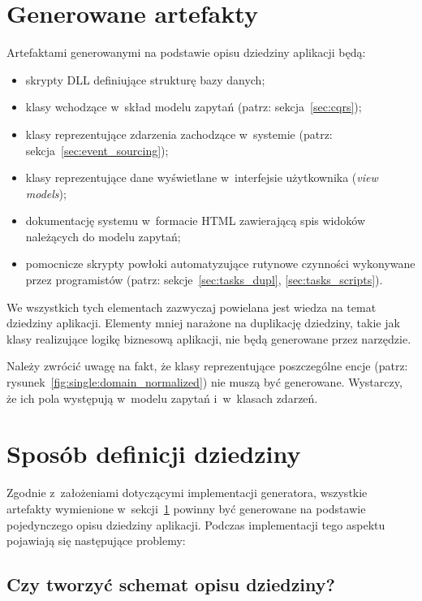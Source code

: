 \section{Generowane artefakty} \label{sec:generated_artifacts}

Artefaktami generowanymi na podstawie opisu dziedziny aplikacji będą:

\begin{itemize}
 \item skrypty DLL definiujące strukturę bazy danych;
 \item klasy wchodzące w~skład modelu zapytań (patrz: sekcja~\ref{sec:cqrs});
 \item klasy reprezentujące zdarzenia zachodzące w~systemie (patrz: sekcja~\ref{sec:event_sourcing});
 \item klasy reprezentujące dane wyświetlane w~interfejsie użytkownika (\emph{view models});
 \item dokumentację systemu w~formacie HTML zawierającą spis widoków należących do modelu zapytań;
 \item pomocnicze skrypty powłoki automatyzujące rutynowe czynności wykonywane przez programistów (patrz: sekcje~\ref{sec:tasks_dupl}, \ref{sec:tasks_scripts}).
\end{itemize}

We wszystkich tych elementach zazwyczaj powielana jest wiedza na temat dziedziny aplikacji.
Elementy mniej narażone na duplikację dziedziny, takie jak klasy realizujące logikę biznesową aplikacji, nie będą generowane przez narzędzie.

Należy zwrócić uwagę na fakt, że klasy reprezentujące poszczególne encje (patrz: rysunek~\ref{fig:single:domain_normalized}) nie muszą być generowane.
Wystarczy, że ich pola występują w~modelu zapytań i~w~klasach zdarzeń.



\section{Sposób definicji dziedziny}

Zgodnie z~założeniami dotyczącymi implementacji generatora, wszystkie artefakty wymienione w~sekcji~\ref{sec:generated_artifacts} powinny być generowane na podstawie pojedynczego opisu dziedziny aplikacji.
Podczas implementacji tego aspektu pojawiają się następujące problemy:


\subsection{Czy tworzyć schemat opisu dziedziny?}

